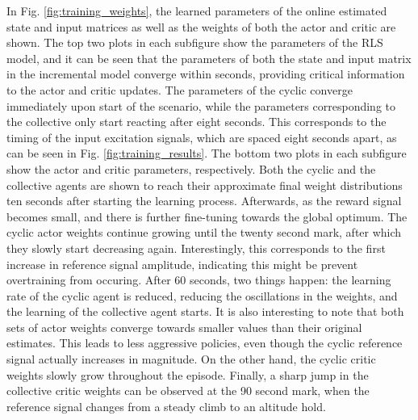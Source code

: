 In Fig. \ref{fig:training_weights}, the learned parameters of the online estimated state and input matrices as well as the weights of both the actor and critic are shown. The top two plots in each subfigure show the parameters of the RLS model, and it can be seen that the parameters of both the state and input matrix in the incremental model converge within seconds, providing critical information to the actor and critic updates. The parameters of the cyclic converge immediately upon start of the scenario, while the parameters corresponding to the collective only start reacting after eight seconds. This corresponds to the timing of the input excitation signals, which are spaced eight seconds apart, as can be seen in Fig. \ref{fig:training_results}. The bottom two plots in each subfigure show the actor and critic parameters, respectively. Both the cyclic and the collective agents are shown to reach their approximate final weight distributions ten seconds after starting the learning process. Afterwards, as the reward signal becomes small, and there is further fine-tuning towards the global optimum. The cyclic actor weights continue growing until the twenty second mark, after which they slowly start decreasing again. Interestingly, this corresponds to the first increase in reference signal amplitude, indicating this might be prevent overtraining from occuring. After 60 seconds, two things happen: the learning rate of the cyclic agent is reduced, reducing the oscillations in the weights, and the learning of the collective agent starts. It is also interesting to note that both sets of actor weights converge towards smaller values than their original estimates. This leads to less aggressive policies, even though the cyclic reference signal actually increases in magnitude. On the other hand, the cyclic critic weights slowly grow throughout the episode. Finally, a sharp jump in the collective critic weights can be observed at the 90 second mark, when the reference signal changes from a steady climb to an altitude hold.

